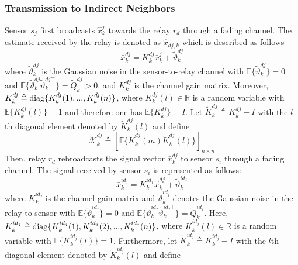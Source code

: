 \documentclass[twocolumn]{IEEEtran}
\newcommand{\diag}{{\rm diag}}
\begin{document}
\subsubsection{Transmission to Indirect Neighbors}
Sensor $s_j$ first broadcasts $\hat{x}_{k}^{j}$ towards the relay $r_d$ through a fading channel. The estimate received by the relay is denoted as $\hat{x}_{dj,k}$ which is described as follows
\begin{equation} \label{xidj1}
\bar{x}_{k}^{dj}=K_{k}^{dj}\bar{x}_{k}^{j}+\tilde{\vartheta}_{k}^{dj}
\end{equation}
where $\tilde{\vartheta}_{k}^{dj}$ is the Gaussian noise in the sensor-to-relay channel with $\mathbb{E}\{\tilde{\vartheta}_{k}^{dj}\}=0$ and $\mathbb{E}\{\tilde{\vartheta}_{k}^{dj}\tilde{\vartheta}_{k}^{dj\top}\}=\tilde{Q}_{k}^{dj}>0$, and $K_{k}^{dj}$ is the channel gain matrix. Moreover, $K_{k}^{dj}\triangleq \diag\{K_{k}^{dj}(1),...,K_{k}^{dj}(n)\}$, where $K_{k}^{dj}(l)\in \mathbb{R}$ is a random variable with $\mathbb{E}\{K_{k}^{dj}(l)\}= 1$ and therefore one has $\mathbb{E}\{K_{k}^{dj}\}= I$.
Let $\tilde{K}_{k}^{dj} \triangleq K_{k}^{dj}-I$ with the $l$th diagonal element denoted
by $\tilde{K}_{k}^{dj}(l)$ and define
\begin{equation}
\tilde{\mathscr{K}}_{k}^{dj}\triangleq\left[\mathbb{E}\{\tilde{K}_{k}^{dj}(m)\tilde{K}_{k}^{dj}(l)\}\right]_{n\times n}
\end{equation}
Then, relay $r_d$ rebroadcasts the signal vector $\bar{x}_{k}^{dj}$ to sensor $s_i$ through a fading channel. The signal received by sensor $s_i$ is represented as follows:
\begin{equation} \label{xidj3}
\bar{x}_{k}^{id_j}=K_{k}^{id_j}\Vec{x}_{k}^{dj}+\tilde{\vartheta}_{k}^{id_j}
\end{equation}
where $K_{k}^{id_j}$ is the channel gain matrix and $\tilde{\vartheta}_{k}^{id_j}$ denotes the Gaussian noise in the relay-to-sensor with $\mathbb{E}\{\tilde{\vartheta}_{k}^{id_j}\}= 0$ and $\mathbb{E}\{\tilde{\vartheta}_{k}^{id_j}\tilde{\vartheta}_{k}^{id_j\top}\} =\tilde{Q}_{k}^{id_j}$. Here, $K_{k}^{id_j} \triangleq \diag\{K_{k}^{id_j}(1),K_{k}^{id_j}(2),...,K_{k}^{id_j}(n)\}$, where $K_{k}^{id_j}(l)\in \mathbb{R}$ is a random variable with $\mathbb{E}\{K_{k}^{id_j}(l)\}=1$. Furthermore, let $\tilde{K}_{k}^{id_j} \triangleq K_{k}^{id_j}-I$ with the $l$th diagonal element denoted by $\tilde{K}_{k}^{id_j}(l)$ and define
\end{document}

